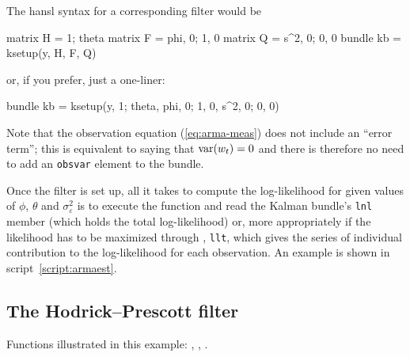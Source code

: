 The \textsf{hansl} syntax for a corresponding filter would be
\begin{code}
matrix H = {1; theta}
matrix F = {phi, 0; 1, 0}
matrix Q = {s^2, 0; 0, 0}
bundle kb = ksetup(y, H, F, Q)
\end{code}
%
or, if you prefer, just a one-liner:
\begin{code}
bundle kb = ksetup(y, {1; theta}, {phi, 0; 1, 0}, {s^2, 0; 0, 0})
\end{code}

Note that the observation equation (\ref{eq:arma-meas}) does not
include an ``error term''; this is equivalent to saying that
$\mbox{var}(w_t) = 0$ and there is therefore no need to add
an \texttt{obsvar} element to the bundle.

Once the filter is set up, all it takes to compute the log-likelihood
for given values of $\phi$, $\theta$ and $\sigma^2_{\varepsilon}$ is
to execute the  function and read the Kalman
bundle's \texttt{lnl} member (which holds the total log-likelihood)
or, more appropriately if the likelihood has to be maximized through
, \texttt{llt}, which gives the series of individual
contribution to the log-likelihood for each observation. An example is
shown in script~\ref{script:armaest}.

\subsection{The Hodrick--Prescott filter}
\label{sec:example_oshp}

Functions illustrated in this example: , ,
.

